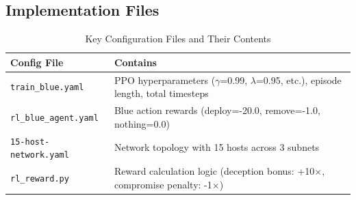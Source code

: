 \documentclass[12pt,oneside]{article}
\begin{document}
\subsection{Implementation Files}

\begin{table}[H]
\centering
\caption{Key Configuration Files and Their Contents}
\label{tab:config_files}
\small
\begin{tabular}{|l|p{7cm}|}
\hline
\rowcolor{cwBorder!30} \textbf{Config File} & \textbf{Contains} \\
\hline
\texttt{train\_blue.yaml} & PPO hyperparameters ($\gamma$=0.99, $\lambda$=0.95, etc.), episode length, total timesteps \\
\texttt{rl\_blue\_agent.yaml} & Blue action rewards (deploy=-20.0, remove=-1.0, nothing=0.0) \\
\texttt{15-host-network.yaml} & Network topology with 15 hosts across 3 subnets \\
\texttt{rl\_reward.py} & Reward calculation logic (deception bonus: +10×, compromise penalty: -1×) \\
\hline
\end{tabular}
\end{table}
\end{document}
